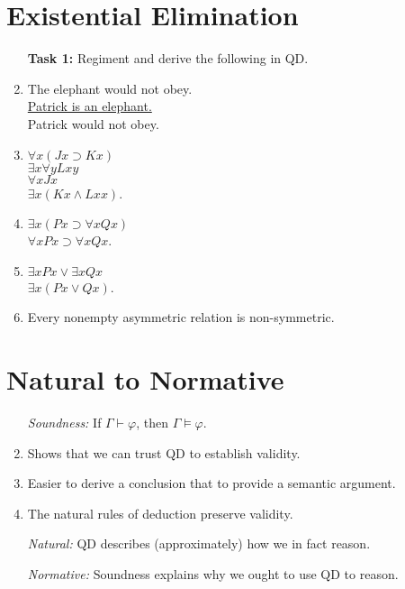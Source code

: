 \documentclass[a4paper, 11pt]{article} %
\newcommand{\qt}[2]{#1 #2} %
\begin{document}
\section*{Existential Elimination}

\begin{enumerate}
  \item[\bf Task 1:] Regiment and derive the following in QD.
  \item The elephant would not obey.\\
    \underline{Patrick is an elephant.}\\ 
    Patrick would not obey.
  \item $\qt{\forall}{x}(Jx \supset Kx)$\\
    $\qt{\exists}{x}\qt{\forall}{y} Lxy$\\
    \underline{$\qt{\forall}{x} Jx$}\\
    $\qt{\exists}{x}(Kx \wedge Lxx)$.
  \item \underline{$\qt{\exists}{x}(Px \supset \qt{\forall}{x}Qx)$}\\
    $\qt{\forall}{x}Px \supset \qt{\forall}{x}Qx$.
  \item \underline{$\qt{\exists}{x}Px \vee \qt{\exists}{x}Qx$}\\
    $\qt{\exists}{x}(Px \vee Qx)$.
  \item Every nonempty asymmetric relation is non-symmetric.
\end{enumerate}





\section*{Natural to Normative}


\begin{enumerate}
  \item[\it Soundness:] If $\Gamma \vdash \varphi$, then $\Gamma \vDash \varphi$.
  \item Shows that we can trust QD to establish validity.
  \item Easier to derive a conclusion that to provide a semantic argument.
  \item The natural rules of deduction preserve validity.
  \item[\it Natural:] QD describes (approximately) how we in fact reason.
  \item[\it Normative:] Soundness explains why we ought to use QD to reason.
\end{enumerate}
\end{document}
